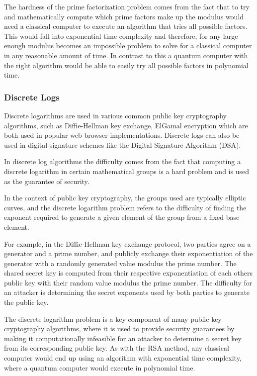 \documentclass{article}
\begin{document}
The hardness of the prime factorization problem comes from the fact that to try and mathematically compute which prime factors make up the modulus would need a classical computer to execute an algorithm that tries all possible factors. This would fall into exponential time complexity and therefore, for any large enough modulus becomes an impossible problem to solve for a classical computer in any reasonable amount of time.  In contrast to this a quantum computer with the right algorithm would be able to easily try all possible factors in polynomial time.

\subsubsection{Discrete Logs}
Discrete logarithms are used in various common public key cryptography algorithms, such as Diffie-Hellman key exchange, ElGamal encryption which are both used in popular web browser implementations. Discrete logs can also be used in  digital signature schemes like the Digital Signature Algorithm (DSA).

In discrete log algorithms the difficulty comes from the fact that computing a discrete logarithm in certain mathematical groups is a hard problem and is used as the guarantee of security.

In the context of public key cryptography, the groups used are typically elliptic curves, and the discrete logarithm problem refers to the difficulty of finding the exponent required to generate a given element of the group from a fixed base element.

For example, in the Diffie-Hellman key exchange protocol, two parties agree on a generator and a prime number, and publicly exchange their exponentiation of the generator with a randomly generated value modulus the prime number. The shared secret key is computed from their respective exponentiation of each others public key with their random value modulus the prime number. The difficulty for an attacker is determining the secret exponents used by both parties to generate the public key.

The discrete logarithm problem is a key component of many public key cryptography algorithms, where it is used to provide security guarantees by making it computationally infeasible for an attacker to determine a secret key from its corresponding public key. As with the RSA method, any classical computer would end up using an algorithm with exponential time complexity, where a quantum computer would execute in polynomial time.
\end{document}
